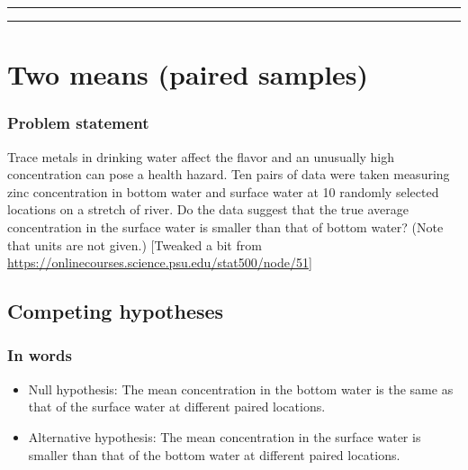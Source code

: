 \documentclass[12pt, krantz2,]{krantz}
\begin{document}
\begin{center}\rule{0.5\linewidth}{\linethickness}\end{center}

\begin{center}\rule{0.5\linewidth}{\linethickness}\end{center}

\hypertarget{two-means-paired-samples}{%
\section{Two means (paired samples)}\label{two-means-paired-samples}}

\hypertarget{problem-statement-4}{%
\subsubsection*{Problem statement}\label{problem-statement-4}}


Trace metals in drinking water affect the flavor and an unusually high concentration can pose a health hazard. Ten pairs of data were taken measuring zinc concentration in bottom water and surface water at 10 randomly selected locations on a stretch of river. Do the data suggest that the true average concentration in the surface water is smaller than that of bottom water? (Note that units are not given.) {[}Tweaked a bit from \url{https://onlinecourses.science.psu.edu/stat500/node/51}{]}

\hypertarget{competing-hypotheses-4}{%
\subsection{Competing hypotheses}\label{competing-hypotheses-4}}

\hypertarget{in-words-4}{%
\subsubsection*{In words}\label{in-words-4}}


\begin{itemize}
\item
  Null hypothesis: The mean concentration in the bottom water is the same as that of the surface water at different paired locations.
\item
  Alternative hypothesis: The mean concentration in the surface water is smaller than that of the bottom water at different paired locations.
\end{itemize}
\end{document}
